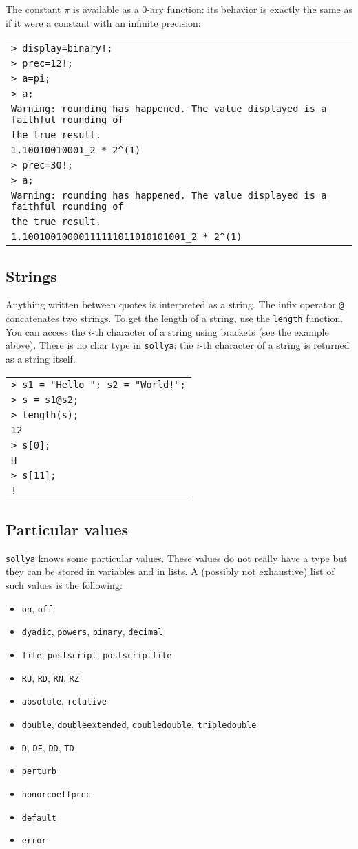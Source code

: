 \documentclass[a4paper]{article}
\newcommand{\com}[1]{\texttt{#1}}
\newcommand{\sollya}{\texttt{sollya}\xspace}
\newcommand{\code}[1]{\begin{center}
\begin{tabular}{|p{14.8cm}|}
\hline
#1
\hline
\end{tabular}
\end{center}
}
\newcommand{\ligne}[1]{\texttt{#1}\\}
\begin{document}
The constant $\pi$ is available as a $0$-ary function: its behavior is exactly the same as if it were a constant with an infinite precision:

\code{
\ligne{> display=binary!;}
\ligne{> prec=12!;}
\ligne{> a=pi;}
\ligne{> a;}
\ligne{Warning: rounding has happened. The value displayed is a faithful rounding of}
\ligne{the true result.}
\ligne{1.10010010001\_2 * 2\^{}(1)}
\ligne{> prec=30!;}
\ligne{> a;}
\ligne{Warning: rounding has happened. The value displayed is a faithful rounding of}
\ligne{the true result.}
\ligne{1.10010010000111111011010101001\_2 * 2\^{}(1)}
}


\subsection{Strings}
Anything written between quotes is interpreted as a string. The infix operator \com{@} concatenates two strings. To get the length of a string, use the \com{length} function. You can access the $i$-th character of a string using brackets (see the example above). There is no char type in \sollya: the $i$-th character of a string is returned as a string itself.

\code{
\ligne{> s1 = "Hello "; s2 = "World!";}
\ligne{> s = s1@s2;}
\ligne{> length(s);}
\ligne{12}
\ligne{> s[0];}
\ligne{H}
\ligne{> s[11];}
\ligne{!}
}

\subsection{Particular values}
\sollya knows some particular values. These values do not really have a type but they can be stored in variables and in lists. A (possibly not exhaustive) list of such values is the following:

\begin{itemize}
\item \com{on}, \com{off}
\item \com{dyadic}, \com{powers}, \com{binary}, \com{decimal}
\item \com{file}, \com{postscript}, \com{postscriptfile}
\item \com{RU}, \com{RD}, \com{RN}, \com{RZ}
\item \com{absolute}, \com{relative}
\item \com{double}, \com{doubleextended}, \com{doubledouble}, \com{tripledouble}
\item \com{D}, \com{DE}, \com{DD}, \com{TD}
\item \com{perturb}
\item \com{honorcoeffprec}
\item \com{default}
\item \com{error}
\end{itemize}
\end{document}
